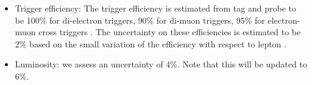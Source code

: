 \begin{itemize}
\item Trigger efficiency: 
  The trigger efficiency is estimated from tag and probe to be 
  100\% for di-electron triggers,
  90\% for di-muon triggers,
  95\% for electron-muon cross triggers \cite{ref:smurfww}. 
  The uncertainty on these efficiencies is estimated to be 2\% based on the small variation of the efficiency
  with respect to lepton \pt.

\item Luminosity: we assess an uncertainty of 4\%. Note that this will be updated to 6\%.

\end{itemize}



